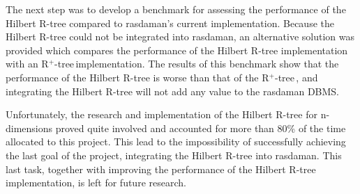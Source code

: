 \documentclass[11pt, a4paper, oneside]{article}
\newcommand{\rtree}{R$^+$-tree$\,$}
\begin{document}
The next step was to develop a benchmark for assessing the performance of the Hilbert R-tree compared to rasdaman's current implementation. Because the Hilbert R-tree could not be integrated into rasdaman, an alternative solution was provided which compares the performance of the Hilbert R-tree implementation with an \rtree implementation. The results of this benchmark show that the performance of the Hilbert R-tree is worse than that of the \rtree, and integrating the Hilbert R-tree will not add any value to the rasdaman DBMS.

Unfortunately, the research and implementation of the Hilbert R-tree for n-dimensions proved quite involved and accounted for more than 80\% of the time allocated to this project. This lead to the impossibility of successfully achieving the last goal of the project, integrating the Hilbert R-tree into rasdaman. This last task, together with improving the performance of the Hilbert R-tree implementation, is left for future research. 

\newpage

\newpage


\newpage
\end{document}
